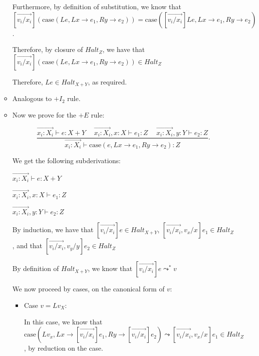 \begin{enumerate}
\begin{itemize}
        Furthermore, by definition of substitution, we know that $[\overrightarrow{v_i / x_i}](\text{case}(L e, L x \rightarrow e_1, R y \rightarrow e_2)) = \text{case}([\overrightarrow{v_i / x_i}] L e, L x \rightarrow e_1, R y \rightarrow e_2)$.

        Therefore, by closure of $Halt_Z$, we have that $[\overrightarrow{v_i / x_i}](\text{case}(L e, L x \rightarrow e_1, R y \rightarrow e_2)) \in Halt_Z$

        Therefore, $L e \in Halt_{X + Y}$, as required.

      \item
        Analogous to $+I_2$ rule.

      \item
        Now we prove for the $+E$ rule:

        \[
          \frac{\overrightarrow{x_i : X_i} \vdash e : X + Y \hspace{15pt} \overrightarrow{x_i : X_i}, x : X \vdash e_1 : Z \hspace{15pt} \overrightarrow{x_i : X_i}, y : Y \vdash e_2 : Z}{\overrightarrow{x_i : X_i} \vdash \text{case}(e, L x \rightarrow e_1, R y \rightarrow e_2) : Z}
        .\] 

        We get the following subderivations:

        $\overrightarrow{x_i : X_i} \vdash e : X + Y$

        $\overrightarrow{x_i : X_i}, x : X \vdash e_1 : Z$

        $\overrightarrow{x_i : X_i}, y : Y \vdash e_2 : Z$


        By induction, we have that $[\overrightarrow{v_i / x_i}] e \in Halt_{X + Y}$, $[\overrightarrow{v_i / x_i}, v_x / x]e_1 \in Halt_Z$, and that $[\overrightarrow{v_i / x_i}, v_y / y]e_2 \in Halt_Z$

        By definition of $Halt_{X + Y}$, we know that $[\overrightarrow{v_i / x_i}] e \leadsto^* v$

        We now proceed by cases, on the canonical form of $v$:

        \begin{itemize}
          \item
            Case $v = L v_X$:

            In this case, we know that $\text{case}(L v_x, L x \rightarrow [\overrightarrow{v_i / x_i}]e_1, R y \rightarrow [\overrightarrow{v_i / x_i}] e_2) \leadsto [\overrightarrow{v_i / x_i}, v_x / x] e_1 \in Halt_Z$, by reduction on the case.


\end{itemize}
\end{itemize}
\end{enumerate}
